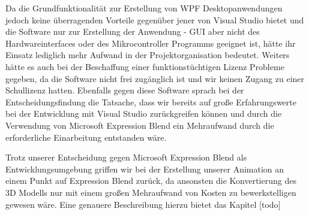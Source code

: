 \begin{itemize}
Da die Grundfunktionalität zur Erstellung von WPF Desktopanwendungen jedoch keine überragenden Vorteile gegenüber jener von Visual Studio bietet und die Software nur zur Erstellung der Anwendung - GUI aber nicht des Hardwareinterfaces oder des Mikrocontroller Programms geeignet ist, hätte ihr Einsatz lediglich mehr Aufwand in der Projektorganisation bedeutet.
Weiters hätte es auch bei der Beschaffung einer funktionstüchtigen Lizenz Probleme gegeben, da die Software nicht frei zugänglich ist und wir keinen Zugang zu einer Schullizenz hatten.
Ebenfalls gegen diese Software sprach bei der Entscheidungsfindung die Tatsache, dass wir bereits auf große Erfahrungswerte bei der Entwicklung mit Visual Studio zurückgreifen können und durch die Verwendung von Microsoft Expression Blend ein Mehraufwand durch die erforderliche Einarbeitung entstanden wäre.

Trotz unserer Entscheidung gegen Microsoft Expression Blend als Entwicklungsumgebung griffen wir bei der Erstellung unserer Animation an einem Punkt auf Expression Blend zurück, da ansonsten die Konvertierung des 3D Modells nur mit einem großen Mehraufwand von Kosten zu bewerkstelligen gewesen wäre. Eine genauere Beschreibung hierzu bietet das Kapitel [todo]
\end{itemize}
